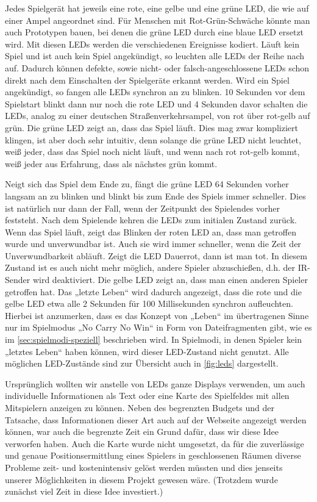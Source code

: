 Jedes Spielgerät hat jeweils eine rote, eine gelbe und eine grüne LED, die wie auf einer Ampel
angeordnet sind.
Für Menschen mit Rot-Grün-Schwäche könnte man auch Prototypen bauen, bei denen die grüne LED durch
eine blaue LED ersetzt wird.
Mit diesen LEDs werden die verschiedenen Ereignisse kodiert.
Läuft kein Spiel und ist auch kein Spiel angekündigt, so leuchten alle LEDs der Reihe nach auf.
Dadurch können defekte, sowie nicht- oder falsch-angeschlossene LEDs schon direkt nach dem
Einschalten der Spielgeräte erkannt werden.
Wird ein Spiel angekündigt, so fangen alle LEDs synchron an zu blinken.
10 Sekunden vor dem Spielstart blinkt dann nur noch die rote LED und 4 Sekunden davor schalten die
LEDs, analog zu einer deutschen Straßenverkehrsampel, von rot über rot-gelb auf grün.
Die grüne LED zeigt an, dass das Spiel läuft.
Dies mag zwar kompliziert klingen, ist aber doch sehr intuitiv, denn solange die grüne LED nicht
leuchtet, weiß jeder, dass das Spiel noch nicht läuft, und wenn nach rot rot-gelb kommt, weiß jeder
aus Erfahrung, dass als nächstes grün kommt.

Neigt sich das Spiel dem Ende zu, fängt die grüne LED 64 Sekunden vorher langsam an zu blinken und
blinkt bis zum Ende des Spiels immer schneller.
Dies ist natürlich nur dann der Fall, wenn der Zeitpunkt des Spielendes vorher feststeht.
Nach dem Spielende kehren die LEDs zum initialen Zustand zurück.
Wenn das Spiel läuft, zeigt das Blinken der roten LED an, dass man getroffen wurde und unverwundbar
ist.
Auch sie wird immer schneller, wenn die Zeit der Unverwundbarkeit abläuft.
Zeigt die LED Dauerrot, dann ist man tot.
In diesem Zustand ist es auch nicht mehr möglich, andere Spieler abzuschießen, d.h. der IR-Sender
wird deaktiviert.
Die gelbe LED zeigt an, dass man einen anderen Spieler getroffen hat.
Das „letzte Leben“ wird dadurch angezeigt, dass die rote und die gelbe LED etwa alle 2 Sekunden für
100 Millisekunden synchron aufleuchten.
Hierbei ist anzumerken, dass es das Konzept von „Leben“ im übertragenen Sinne nur im Spielmodus
„No Carry No Win“ in Form von Dateifragmenten gibt, wie es im \cref{sec:spielmodi-speziell}
beschrieben wird.
In Spielmodi, in denen Spieler kein „letztes Leben“ haben können, wird dieser LED-Zustand nicht
genutzt.
Alle möglichen LED-Zustände sind zur Übersicht auch in \cref{fig:leds} dargestellt.

Ursprünglich wollten wir anstelle von LEDs ganze Displays verwenden, um auch individuelle
Informationen als Text oder eine Karte des Spielfeldes mit allen Mitspielern anzeigen zu können.
Neben des begrenzten Budgets und der Tatsache, dass Informationen dieser Art auch auf der Webseite
angezeigt werden können, war auch die begrenzte Zeit ein Grund dafür, dass wir diese Idee verworfen
haben.
Auch die Karte wurde nicht umgesetzt, da für die zuverlässige und genaue Positionsermittlung eines
Spielers in geschlossenen Räumen diverse Probleme zeit- und kostenintensiv gelöst werden müssten und
dies jenseits unserer Möglichkeiten in diesem Projekt gewesen wäre.
(Trotzdem wurde zunächst viel Zeit in diese Idee investiert.)
